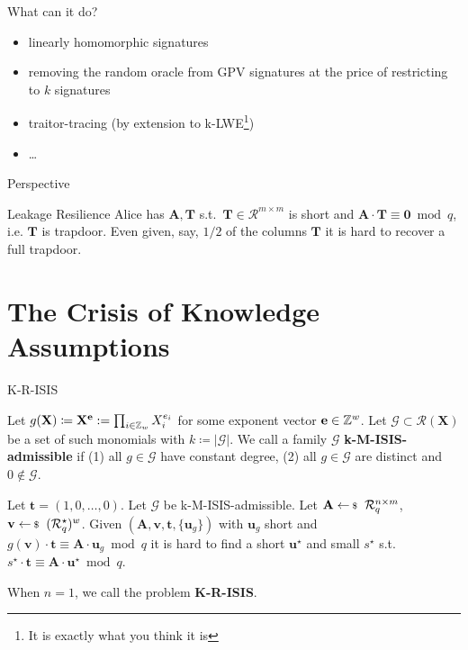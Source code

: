 \documentclass[xcolor=table,10pt,aspectratio=169]{beamer}
\renewcommand{\vec}[1]{\ensuremath{\mathbf{#1}}\xspace}
\providecommand{\mat}[1]{\ensuremath{\vec{#1}}\xspace}
\providecommand{\ring}[0]{\ensuremath{\mathcal{R}}\xspace}
\begin{document}
\begin{frame}[label={sec:orge232b03}]{What can it do?}
\begin{itemize}
\item linearly homomorphic signatures
\item removing the random oracle from GPV signatures at the price of restricting to \(k\) signatures
\item traitor-tracing (by extension to k-LWE\footnote{It is exactly what you think it is})
\item …
\end{itemize}
\end{frame}

\begin{frame}[label={sec:org1e106ed}]{Perspective}
\begin{alertblock}{Leakage Resilience}
Alice has \(\mat{A}, \mat{T}\) s.t. \(\mat{T} \in \ring^{m \times m}\) is short and \(\mat{A} \cdot \mat{T} \equiv \mat{0} \bmod q\), i.e. \(\mat{T}\) is trapdoor. Even given, say, \(1/2\) of the columns \(\mat{T}\) it is hard to recover a full trapdoor.
\end{alertblock}
\end{frame}

\section{The Crisis of Knowledge Assumptions}
\label{sec:orgf91c12f}
\begin{frame}[label={sec:org7b538ac}]{K-R-ISIS}
\begin{definition}
Let \(g(\vec{X}) \coloneqq  \vec{X}^{\vec{e}} := \prod_{i \in \ZZ_w} X_i^{e_i}\) for some exponent vector \(\vec{e} \in \ZZ^w\). Let \(\mathcal{G} \subset \mathcal{R}(\vec{X})\) be a set of such monomials with \(k \coloneqq |\mathcal{G}|\). We call a family \(\mathcal{G}\) \textbf{k-M-ISIS-admissible} if (1) all \(g \in \mathcal{G}\) have constant degree, (2) all \(g \in \mathcal{G}\) are distinct and \(0 \not\in\mathcal{G}\).
\end{definition}

\begin{definition}
Let \(\vec{t} = (1,0,\ldots,0)\).
Let \(\mathcal{G}\) be k-M-ISIS-admissible.
Let  \(\mat{A} \sample \ring_q^{n \times m}\), \(\vec{v} \sample (\ring_q^\star)^w\). Given \((\mat{A}, \vec{v}, \vec{t}, \{\vec{u}_{g}\})\) with \(\vec{u}_{g}\) short and \(g(\vec{v}) \cdot \vec{t} \equiv \mat{A}\cdot \vec{u}_{g} \bmod q\) it is hard to find a short \(\vec{u}^{\star}\) and small \(s^{\star}\) s.t. \(s^\star \cdot \vec{t} \equiv \mat{A} \cdot \vec{u}^{\star} \bmod q.\)

When \(n = 1\), we call the problem \textbf{K-R-ISIS}.
\end{definition}

{\footnotesize {} \par}
\end{frame}
\end{document}
